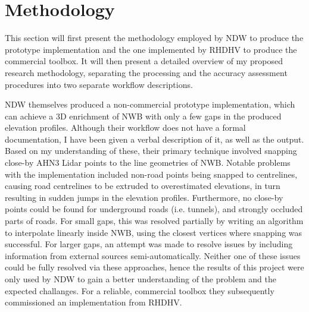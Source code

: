 
\section{Methodology}
\label{sec:m}

This section will first present the methodology employed by NDW to produce the prototype implementation and the one implemented by RHDHV to produce the commercial toolbox. It will then present a detailed overview of my proposed research methodology, separating the processing and the accuracy assessment procedures into two separate workflow descriptions.

NDW themselves produced a non-commercial prototype implementation, which can achieve a 3D enrichment of NWB with only a few gaps in the produced elevation profiles. Although their workflow does not have a formal documentation, I have been given a verbal description of it, as well as the output. Based on my understanding of these, their primary technique involved snapping close-by AHN3 Lidar points to the line geometries of NWB. Notable problems with the implementation included non-road points being snapped to centrelines, causing road centrelines to be extruded to overestimated elevations, in turn resulting in sudden jumps in the elevation profiles. Furthermore, no close-by points could be found for underground roads (i.e. tunnels), and strongly occluded parts of roads. For small gaps, this was resolved partially by writing an algorithm to interpolate linearly inside NWB, using the closest vertices where snapping was successful. For larger gaps, an attempt was made to resolve issues by including information from external sources semi-automatically. Neither one of these issues could be fully resolved via these approaches, hence the results of this project were only used by NDW to gain a better understanding of the problem and the expected challanges. For a reliable, commercial toolbox they subsequently commissioned an implementation from RHDHV.

